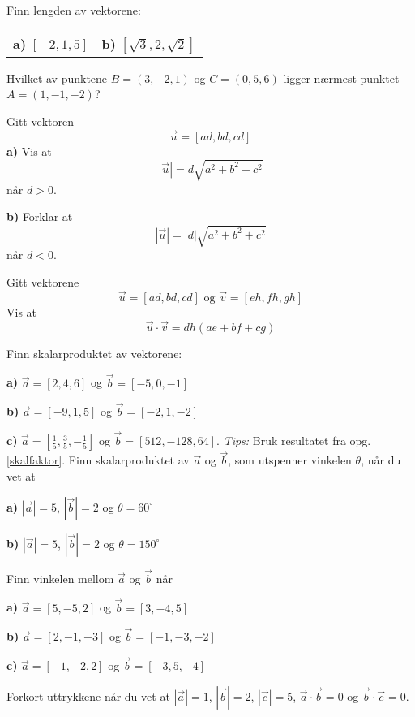 %




\eqlen	
\opgt

\setcounter{section}{1}	
Finn lengden av vektorene:\os
\begin{tabular}{@{}l l}
\textbf{a)} $ [-2, 1, 5] $ & \quad\textbf{b)} $ [\sqrt{3}, 2,  \sqrt{2}] $
\end{tabular}	
	
Hvilket av punktene $ {B=(3, -2, 1)} $ og $ {C=(0, 5, 6) }$ ligger nærmest punktet $ {A=(1, -1, -2)} $?

Gitt vektoren
\[ \vec{u}=[ad, bd, cd]\]
\textbf{a)} Vis at
\[ |\vec{u}|=d\sqrt{a^2 + b^2 + c^2} \]
når $ d>0 $.\os

\textbf{b)} Forklar at
\[ |\vec{u}|=|d|\sqrt{a^2 + b^2 + c^2} \]
når $ d<0 $.

\nes
{}
Gitt vektorene
\[ \vec{u}=[ad, bd, cd] \text{ og } \vec{v}=[eh, fh, gh] \]
Vis at
\[ \vec{u}\cdot\vec{v}=dh(ae+bf+cg) \] \vds

Finn skalarproduktet av vektorene:\os

\textbf{a)} $ \vec{a}=[2, 4, 6] $ og $ \vec{b}=[-5, 0, -1] $\os 

\textbf{b)} $ \vec{a}=[-9, 1, 5] $ og $\vec{b}= [-2, 1, -2] $\os

\textbf{c)} $ \vec{a}=\left[\frac{1}{5}, \frac{3}{5},- \frac{1}{5}\right] $ og $ \vec{b}=[512, -128, 64] $. \textsl{Tips:} Bruk resultatet fra opg. \ref{skalfaktor}.
\newpage
{}
Finn skalarproduktet av $ \vec{a} $ og $ \vec{b} $, som utspenner vinkelen $ \theta $, når du vet at\os

\textbf{a)} $ |\vec{a}|=5 $, $ |\vec{b}|= 2$ og $ \theta = 60^\circ $\os

\textbf{b)} $ |\vec{a}|=5 $, $ |\vec{b}|= 2$ og $ \theta = 150^\circ $

Finn vinkelen mellom $ \vec{a} $ og $ \vec{b} $ når\os

\textbf{a)} $ \vec{a}=[ 5 ,-5,  2]$ og $ \vec{b}=[ 3 ,-4 , 5] $\os

\textbf{b)} $ \vec{a}=[ 2 ,-1,  -3]$ og $ \vec{b}=[ -1 ,-3 , -2] $\os

\textbf{c)} $ \vec{a}=[ -1 ,-2,  2]$ og $ \vec{b}=[ -3 , 5 , -4] $

Forkort uttrykkene når du vet at $ |\vec{a}|=1 $, $ |\vec{b}|=2 $, $ |\vec{c}|=5 $, $ \vec{a}\cdot\vec{b}=0 $ og $ \vec{b}\cdot\vec{c}=0 $.\os

